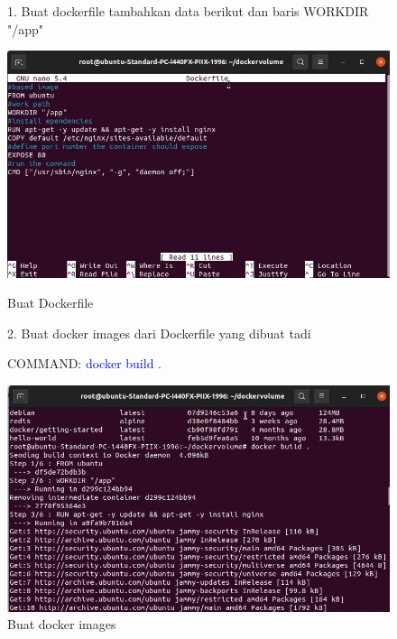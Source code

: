     \begin{figure}
    1. Buat dockerfile tambahkan data berikut dan baris WORKDIR "/app"
        \begin{center}
            \includegraphics[width=\linewidth]{image/41.jpg}
            \caption{Buat Dockerfile}
            \label{fig:my_figure}
        \end{center}
    
    2. Buat docker images dari Dockerfile yang dibuat tadi
    
    COMMAND: \textcolor{Blue}{docker build .}
        \begin{center}
            \includegraphics[width=\linewidth]{image/42.jpg}
            \caption{Buat docker images}
            \label{fig:my_figure}
        \end{center}
\end{figure}

